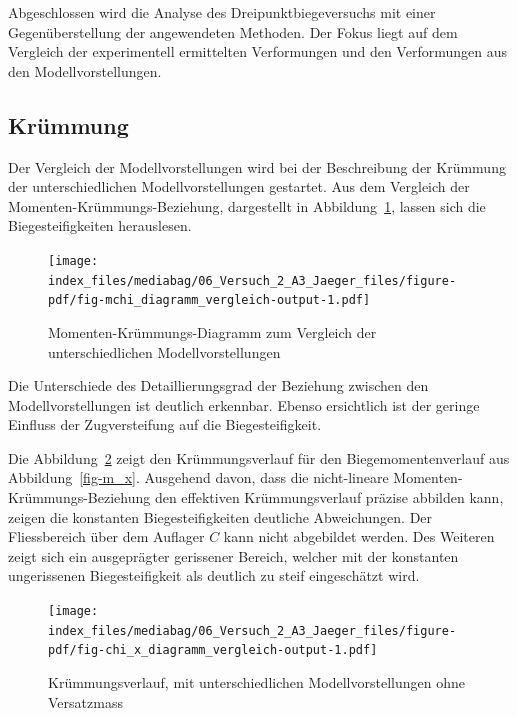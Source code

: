 \documentclass[
  12pt,
  letterpaper,
  egregdoesnotlikesansseriftitles]{scrreprt}
\begin{document}
Abgeschlossen wird die Analyse des Dreipunktbiegeversuchs mit einer
Gegenüberstellung der angewendeten Methoden. Der Fokus liegt auf dem
Vergleich der experimentell ermittelten Verformungen und den
Verformungen aus den Modellvorstellungen.

\hypertarget{kruxfcmmung}{%
\subsection{Krümmung}\label{kruxfcmmung}}

Der Vergleich der Modellvorstellungen wird bei der Beschreibung der
Krümmung der unterschiedlichen Modellvorstellungen gestartet. Aus dem
Vergleich der Momenten-Krümmungs-Beziehung, dargestellt in
Abbildung~\ref{fig-mchi_diagramm_vergleich}, lassen sich die
Biegesteifigkeiten herauslesen.

\begin{figure}[H]

{\centering \texttt{[image: index\_files/mediabag/06\_Versuch\_2\_A3\_Jaeger\_files/figure-pdf/fig-mchi\_diagramm\_vergleich-output-1.pdf]}

}

\caption{\label{fig-mchi_diagramm_vergleich}Momenten-Krümmungs-Diagramm
zum Vergleich der unterschiedlichen Modellvorstellungen}

\end{figure}

Die Unterschiede des Detaillierungsgrad der Beziehung zwischen den
Modellvorstellungen ist deutlich erkennbar. Ebenso ersichtlich ist der
geringe Einfluss der Zugversteifung auf die Biegesteifigkeit.

Die Abbildung~\ref{fig-chi_x_diagramm_vergleich} zeigt den
Krümmungsverlauf für den Biegemomentenverlauf aus
Abbildung~\ref{fig-m_x}. Ausgehend davon, dass die nicht-lineare
Momenten-Krümmungs-Beziehung den effektiven Krümmungsverlauf präzise
abbilden kann, zeigen die konstanten Biegesteifigkeiten deutliche
Abweichungen. Der Fliessbereich über dem Auflager \(C\) kann nicht
abgebildet werden. Des Weiteren zeigt sich ein ausgeprägter gerissener
Bereich, welcher mit der konstanten ungerissenen Biegesteifigkeit als
deutlich zu steif eingeschätzt wird.

\begin{figure}[H]

{\centering \texttt{[image: index\_files/mediabag/06\_Versuch\_2\_A3\_Jaeger\_files/figure-pdf/fig-chi\_x\_diagramm\_vergleich-output-1.pdf]}

}

\caption{\label{fig-chi_x_diagramm_vergleich}Krümmungsverlauf, mit
unterschiedlichen Modellvorstellungen ohne Versatzmass}

\end{figure}
\end{document}
